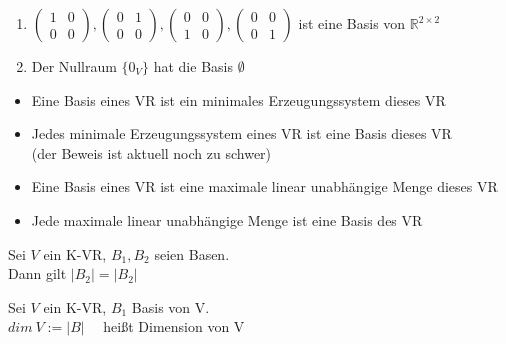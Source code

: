 \documentclass{../tudscript}
\begin{document}
\begin{enumerate}
\begin{itemize}
  \end{itemize}
\item
  \(\begin{pmatrix}1 & 0 \\ 0 & 0\end{pmatrix}, \begin{pmatrix}0 & 1 \\ 0 & 0\end{pmatrix},  \begin{pmatrix}0 & 0 \\ 1 & 0\end{pmatrix}, \begin{pmatrix}0 & 0 \\ 0 & 1\end{pmatrix}\)
  ist eine Basis von \(\mathbb{R}^{2 \times 2}\)
\item
  Der Nullraum \(\{0_V\}\) hat die Basis \(\emptyset\)
\end{enumerate}

\hypertarget{bemerkung}{%
\label{bemerkung}}

\begin{itemize}
\tightlist
\item
  Eine Basis eines VR ist ein minimales Erzeugungssystem dieses VR
\item
  Jedes minimale Erzeugungssystem eines VR ist eine Basis dieses VR\\
  (der Beweis ist aktuell noch zu schwer)\texttrademark
\end{itemize}

\hypertarget{bemerkung-1}{%
\label{bemerkung-1}}

\begin{itemize}
\tightlist
\item
  Eine Basis eines VR ist eine maximale linear unabhängige Menge dieses
  VR
\item
  Jede maximale linear unabhängige Menge ist eine Basis des VR
\end{itemize}

\hypertarget{satz}{%
\label{satz}}

Sei \(V\) ein K-VR, \(B_1, B_2\) seien Basen.\\
Dann gilt \(|B_2| = |B_2|\)

\hypertarget{definition-3}{%
\label{definition-3}}

Sei \(V\) ein K-VR, \(B_1\) Basis von V.\\
\(dim\>V := |B|\quad\) heißt Dimension von V
\end{document}
